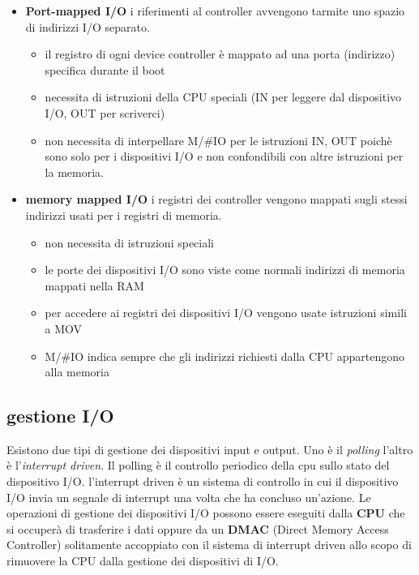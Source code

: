 \documentclass{article}
\begin{document}
        \begin{itemize}
            \item \textbf{Port-mapped I/O}
            i riferimenti al controller avvengono tarmite uno spazio di indirizzi I/O separato.
            
            \begin{itemize}

                \item il registro di ogni device controller è mappato ad una porta (indirizzo) specifica durante il boot
                \item necessita di istruzioni della CPU speciali (IN per leggere dal dispositivo I/O, OUT per scriverci)
                \item non necessita di interpellare M/\#IO per le istruzioni IN, OUT poichè sono solo per i dispositivi I/O e non confondibili con altre istruzioni per la memoria.
                
            \end{itemize}
            
            \item \textbf{memory mapped I/O}
            i registri dei controller vengono mappati sugli stessi indirizzi usati per i registri di memoria.
            
            \begin{itemize}

                \item non necessita di istruzioni speciali
                \item le porte dei dispositivi I/O sono viste come normali indirizzi di memoria mappati nella RAM
                \item per accedere ai registri dei dispositivi I/O vengono usate istruzioni simili a MOV
                \item M/\#IO indica sempre che gli indirizzi richiesti dalla CPU appartengono alla memoria 
                
            \end{itemize}
        \end{itemize}

    \subsection{gestione I/O}
        Esistono due tipi di gestione dei dispositivi input e output. Uno è il \textit{polling} l'altro è l'\textit{interrupt driven}.
        Il polling è il controllo periodico della cpu sullo stato del dispositivo I/O.
        l'interrupt driven è un sistema di controllo in cui il dispositivo I/O invia un segnale di interrupt una volta che ha concluso un'azione.
        Le operazioni di gestione dei dispositivi I/O possono essere eseguiti dalla \textbf{CPU} che si occuperà di trasferire i dati oppure da un \textbf{DMAC} (Direct Memory Access Controller) solitamente accoppiato con il sistema di interrupt driven allo scopo di rimuovere la CPU dalla gestione dei dispositivi di I/O.
\end{document}
